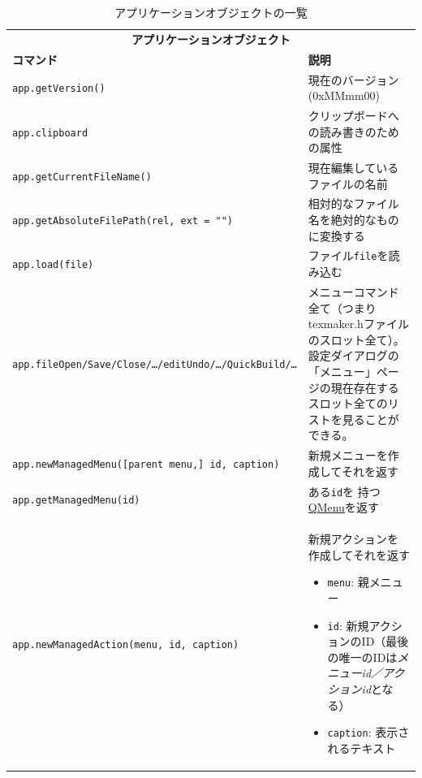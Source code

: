 \begin{table}[H]
  \centering
  \caption{アプリケーションオブジェクトの一覧}
  \begin{tabularx}{\linewidth}{lX}
    \hline
    \multicolumn{2}{c}{\textbf{アプリケーションオブジェクト}}\\
    \textbf{コマンド} & \textbf{説明}\\
    \hline
    \texttt{app.getVersion()} & 現在のバージョン(0xMMmm00)\\
    \texttt{app.clipboard} & クリップボードへの読み書きのための属性\\
    \texttt{app.getCurrentFileName()} & 現在編集しているファイルの名前\\
    \texttt{app.getAbsoluteFilePath(rel, ext = "")}
      & 相対的なファイル名を絶対的なものに変換する\\
    \texttt{app.load(file)} & ファイル\texttt{file}を読み込む\\
    \texttt{app.fileOpen/Save/Close/\ldots{}/editUndo/\ldots{}/QuickBuild/\ldots{}}
      & メニューコマンド全て（つまりtexmaker.hファイルのスロット全て）。
      設定ダイアログの「メニュー」ページの現在存在する
      スロット全てのリストを見ることができる。\\
    \texttt{app.newManagedMenu({[}parent menu,{]} id, caption)}
      & 新規メニューを作成してそれを返す\\
    \texttt{app.getManagedMenu(id)}
      & ある\texttt{id}を
      持つ\href{http://developer.qt.nokia.com/doc/qt-4.8/QMenu.html}{QMenu}を返す\\
    \texttt{app.newManagedAction(menu, id, caption)}
      & 新規アクションを作成してそれを返す
      \begin{itemize}
      \item
        \texttt{menu}: 親メニュー
      \item
        \texttt{id}:
        新規アクションのID（最後の唯一のIDは\emph{メニューid／アクションid}となる）
      \item
        \texttt{caption}: 表示されるテキスト
      \end{itemize}


\end{tabularx}
\end{table}
